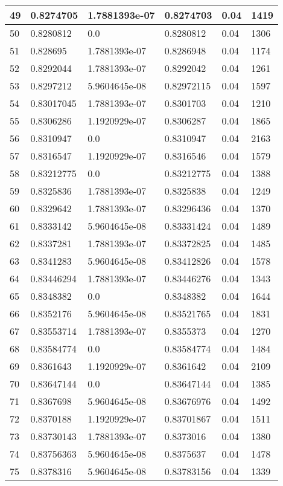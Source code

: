 \begin{longtable}{|l|l|l|l|l|l|}
49 & 0.8274705 & 1.7881393e-07 & 0.8274703 & 0.04 & 1419 \\ \hline 
50 & 0.8280812 & 0.0 & 0.8280812 & 0.04 & 1306 \\ \hline 
51 & 0.828695 & 1.7881393e-07 & 0.8286948 & 0.04 & 1174 \\ \hline 
52 & 0.8292044 & 1.7881393e-07 & 0.8292042 & 0.04 & 1261 \\ \hline 
53 & 0.8297212 & 5.9604645e-08 & 0.82972115 & 0.04 & 1597 \\ \hline 
54 & 0.83017045 & 1.7881393e-07 & 0.8301703 & 0.04 & 1210 \\ \hline 
55 & 0.8306286 & 1.1920929e-07 & 0.8306287 & 0.04 & 1865 \\ \hline 
56 & 0.8310947 & 0.0 & 0.8310947 & 0.04 & 2163 \\ \hline 
57 & 0.8316547 & 1.1920929e-07 & 0.8316546 & 0.04 & 1579 \\ \hline 
58 & 0.83212775 & 0.0 & 0.83212775 & 0.04 & 1388 \\ \hline 
59 & 0.8325836 & 1.7881393e-07 & 0.8325838 & 0.04 & 1249 \\ \hline 
60 & 0.8329642 & 1.7881393e-07 & 0.83296436 & 0.04 & 1370 \\ \hline 
61 & 0.8333142 & 5.9604645e-08 & 0.83331424 & 0.04 & 1489 \\ \hline 
62 & 0.8337281 & 1.7881393e-07 & 0.83372825 & 0.04 & 1485 \\ \hline 
63 & 0.8341283 & 5.9604645e-08 & 0.83412826 & 0.04 & 1578 \\ \hline 
64 & 0.83446294 & 1.7881393e-07 & 0.83446276 & 0.04 & 1343 \\ \hline 
65 & 0.8348382 & 0.0 & 0.8348382 & 0.04 & 1644 \\ \hline 
66 & 0.8352176 & 5.9604645e-08 & 0.83521765 & 0.04 & 1831 \\ \hline 
67 & 0.83553714 & 1.7881393e-07 & 0.8355373 & 0.04 & 1270 \\ \hline 
68 & 0.83584774 & 0.0 & 0.83584774 & 0.04 & 1484 \\ \hline 
69 & 0.8361643 & 1.1920929e-07 & 0.8361642 & 0.04 & 2109 \\ \hline 
70 & 0.83647144 & 0.0 & 0.83647144 & 0.04 & 1385 \\ \hline 
71 & 0.8367698 & 5.9604645e-08 & 0.83676976 & 0.04 & 1492 \\ \hline 
72 & 0.8370188 & 1.1920929e-07 & 0.83701867 & 0.04 & 1511 \\ \hline 
73 & 0.83730143 & 1.7881393e-07 & 0.8373016 & 0.04 & 1380 \\ \hline 
74 & 0.83756363 & 5.9604645e-08 & 0.8375637 & 0.04 & 1478 \\ \hline 
75 & 0.8378316 & 5.9604645e-08 & 0.83783156 & 0.04 & 1339 \\ \hline 
\end{longtable}
